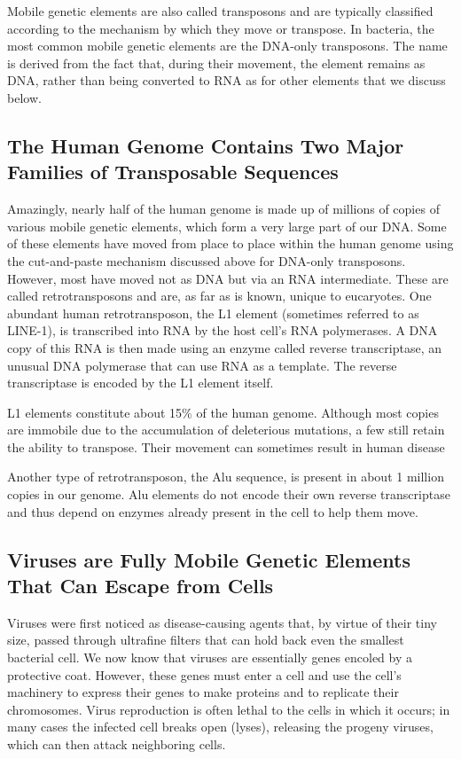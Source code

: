 Mobile genetic elements are also called transposons and are typically
classified according to the mechanism by which they move or transpose.
In bacteria, the most common mobile genetic elements are the DNA-only
transposons. The name is derived from the fact that, during their movement,
the element remains as DNA, rather than being converted to RNA as
for other elements that we discuss below.

\subsection{The Human Genome Contains Two Major Families of Transposable Sequences}

Amazingly, nearly half of the human genome is made up of millions of
copies of various mobile genetic elements, which form a very large part
of our DNA. Some of these elements have moved from place to place
within the human genome using the cut-and-paste mechanism discussed
above for DNA-only transposons. However, most have
moved not as DNA but via an RNA intermediate. These are called retrotransposons
and are, as far as is known, unique to eucaryotes.
One abundant human retrotransposon, the L1 element (sometimes referred
to as LINE-1), is transcribed into RNA by the host cell’s RNA polymerases.
A DNA copy of this RNA is then made using an enzyme called reverse
transcriptase, an unusual DNA polymerase that can use RNA as a template.
The reverse transcriptase is encoded by the L1 element itself.

L1 elements constitute about 15\% of the human genome. Although most
copies are immobile due to the accumulation of deleterious mutations, a
few still retain the ability to transpose. Their movement can sometimes
result in human disease

Another type of retrotransposon, the Alu sequence, is present in about
1 million copies in our genome. Alu elements do not encode their own
reverse transcriptase and thus depend on enzymes already present in the
cell to help them move.

\subsection{Viruses are Fully Mobile Genetic Elements That Can Escape from Cells}

Viruses were first noticed as disease-causing agents that, by virtue of
their tiny size, passed through ultrafine filters that can hold back even the
smallest bacterial cell. We now know that viruses are essentially genes
encoled by a protective coat.
However, these genes must enter a
cell and use the cell’s machinery to express their genes to make proteins
and to replicate their chromosomes. Virus reproduction is often lethal to
the cells in which it occurs; in many cases the infected cell breaks open
(lyses), releasing the progeny viruses, which can then attack neighboring
cells.

